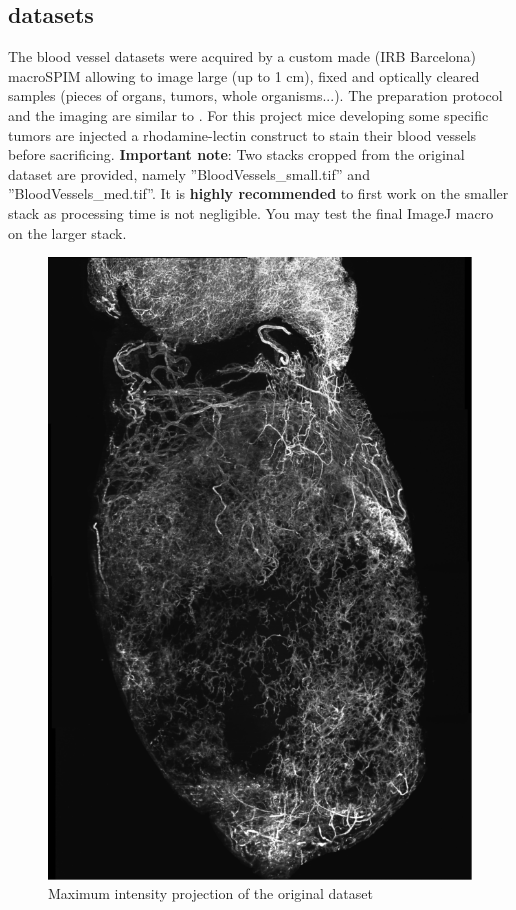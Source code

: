 \subsection{datasets}
%
The blood vessel datasets were acquired by a custom made (IRB Barcelona) macroSPIM allowing to image large (up to 1 cm), fixed and optically cleared samples (pieces of organs, tumors, whole organisms...). The preparation protocol and the imaging are similar to \cite{jahrling20093d}. For this project mice developing some specific tumors are injected a rhodamine-lectin construct to stain their blood vessels before sacrificing.
\textbf{Important note}: Two stacks cropped from the original dataset are provided, namely ''BloodVessels\_small.tif'' and ''BloodVessels\_med.tif''. It is \textbf{highly recommended} to first work on the smaller stack as processing time is not negligible. You may test the final ImageJ macro on the larger stack. 
%
\begin{figure}[h!]
  \caption{Maximum intensity projection of the original dataset} \label{fig:bloodvessels}
  \centering
    \includegraphics[scale=0.57]{fig/BloodVessels.png}
\end{figure}
%
%
